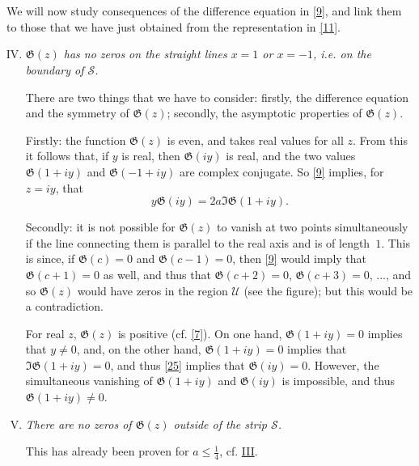 \documentclass{article}
\newcommand{\GG}{\mathfrak{G}}
\newcommand{\UU}{\mathscr{U}}
\renewcommand{\SS}{\mathscr{S}}
\renewcommand{\leq}{\leqslant}
\newcommand{\oldpage}[1]{\marginpar{\phantom{.}\\\footnotesize$\Big\vert$ \textit{p.~#1}}}
\begin{document}
\section{}
\label{section3}

We will now study consequences of the difference equation in \cref{9}, and link them to those that we have just obtained from the representation in \cref{11}.

\begin{enumerate}[I.]
\setcounter{enumi}{3}
  \item \emph{$\GG(z)$ has no zeros on the straight lines $x=1$ or $x=-1$, i.e. on the boundary of $\SS$.}
    \label{IV}

\oldpage{312}
    There are two things that we have to consider:
    firstly, the difference equation and the symmetry of $\GG(z)$; secondly, the asymptotic properties of $\GG(z)$.

    Firstly:
    the function $\GG(z)$ is even, and takes real values for all $z$.
    From this it follows that, if $y$ is real, then $\GG(iy)$ is real, and the two values $\GG(1+iy)$ and $\GG(-1+iy)$ are complex conjugate.
    So \cref{9} implies, for $z=iy$, that
    \[
    \label{25}
      y\GG(iy) = 2a\Im\GG(1+iy).
    \tag{25}
    \]

    Secondly:
    it is not possible for $\GG(z)$ to vanish at two points simultaneously if the line connecting them is parallel to the real axis and is of length~$1$.
    This is since, if $\GG(c)=0$ and $\GG(c-1)=0$, then \cref{9} would imply that $\GG(c+1)=0$ as well, and thus that $\GG(c+2)=0$, $\GG(c+3)=0$, ..., and so $\GG(z)$ would have zeros in the region $\UU$ (see the figure); but this would be a contradiction.

    For real $z$, $\GG(z)$ is positive (cf. \cref{7}).
    On one hand, $\GG(1+iy)=0$ implies that $y\neq0$, and, on the other hand, $\GG(1+iy)=0$ implies that $\Im\GG(1+iy)=0$, and thus \cref{25} implies that $\GG(iy)=0$.
    However, the simultaneous vanishing of $\GG(1+iy)$ and $\GG(iy)$ is impossible, and thus $\GG(1+iy)\neq0$.
  \item \emph{There are no zeros of $\GG(z)$ outside of the strip $\SS$.}
    \label{V}

    This has already been proven for $a\leq\frac14$, cf. \hyperref[III]{III}.
\end{enumerate}




\nocite{*}

\end{document}
